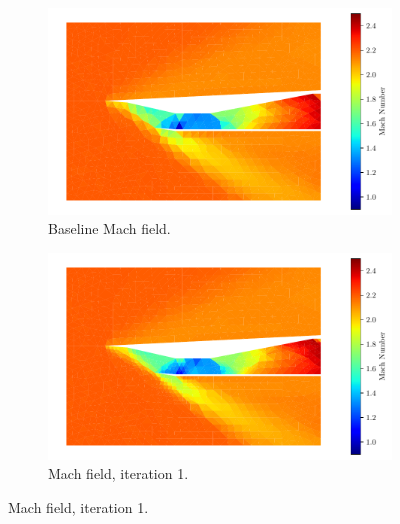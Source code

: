 \pagebreak
\begin{figure}[h!]\ContinuedFloat
    \centering
    \begin{subfigure}[h]{0.49\linewidth}
        \centering
        \includegraphics[width=\linewidth]{rep/q4/Machfield0.pdf}
        \caption{Baseline Mach field.}
    \end{subfigure}
    \begin{subfigure}[h]{0.49\linewidth}
        \centering
        \includegraphics[width=\linewidth]{rep/q4/Machfield1.pdf}
        \caption{Mach field, iteration 1.}
    \end{subfigure}


\end{figure}
